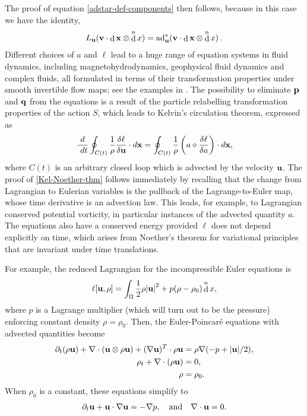 \documentclass[12pt,onesided]{article}
\def\q{{\bf{q}}}
\def\p{{\bf{p}}}
\def\u{{\bf{u}}}
\def\v{{\bf{v}}}
\DeclareMathOperator{\diff}{d}
\newcommand{\difft}{d}
\begin{document}
The proof of equation \eqref{adstar-def-components} then follows, because in this case we have the identity,
\begin{align}
L_{\u}(\v\cdot \diff {\bf x} \otimes \diff^nx) 
= {\rm ad}^*_{\u}(\v\cdot \diff {\bf x} \otimes \diff^nx)
\,.
\end{align}
%
Different choices of $a$ and $\ell$ lead to a huge range of equation
systems in fluid dynamics, including magnetohydrodynamics, geophysical
fluid dynamics and complex fluids, all formulated in terms of their transformation properties under smooth invertible flow maps; see the examples in
\cite{holm1998euler}.  The possibility to eliminate $\p$ and $\q$ from
the equations is a result of the particle relabelling transformation properties of the
action $S$, which leads to Kelvin's circulation theorem, expressed
as \cite{holm1998euler}
\begin{equation}
  \frac{\difft}{\,{{\,\difft t}}}\oint_{C(t)} \frac{1}{\rho}\frac{\delta \ell}{\delta
    \u}\cdot\difft {\bf x} = \oint_{C(t)} \frac{1}{\rho}\left(a\diamond \frac{\delta \ell}{\delta a}\right)\cdot\difft {\bf x},
\label{Kel-Noether-thm}    
\end{equation}
where $C(t)$ is an arbitrary closed loop which is advected by the
velocity $\u$. The proof of \eqref{Kel-Noether-thm} follows immediately by recalling  that the change from Lagrangian to Eulerian variables is the pullback of the Lagrange-to-Euler map, whose time derivative is an advection law. This leads, for example, to Lagrangian conserved potential vorticity, in particular instances of the advected quantity $a$. The equations
also have a conserved energy provided $\ell$ does not depend explicitly on time, which arises from Noether's theorem for  variational principles that are invariant under time translations.

For example, the reduced Lagrangian for the incompressible Euler equations
is 
\begin{equation}
\label{eq:ell euler}
\ell[{\u},\rho] = \int_\Omega \frac12{\rho|{\u}|}^{2} + p(\rho-\rho_0)\diff ^n x,
\end{equation}
where $p$ is a Lagrange multiplier (which will turn out to be the
pressure) enforcing constant density $\rho=\rho_0$. Then, the
Euler-Poincar\'e equations with advected quantities become
\begin{align}
\partial_t(\rho{\u}) + \nabla\cdot({\u}\otimes \rho{\u}) 
+ (\nabla {\u})^T\cdot \rho{\u} 
& = \rho\nabla (-p + |{\u}|/2), \\
\rho_t + \nabla\cdot(\rho{\u}) & = 0, \\
\rho &= \rho_0.
\end{align}
When $\rho_0$ is a constant, these equations simplify to 
\begin{align}
\partial_t {\u} + {\u}\cdot\nabla{\u} = -\nabla p
, \quad\hbox{and}\quad
\nabla\cdot {\u} = 0.
\end{align}
\end{document}
